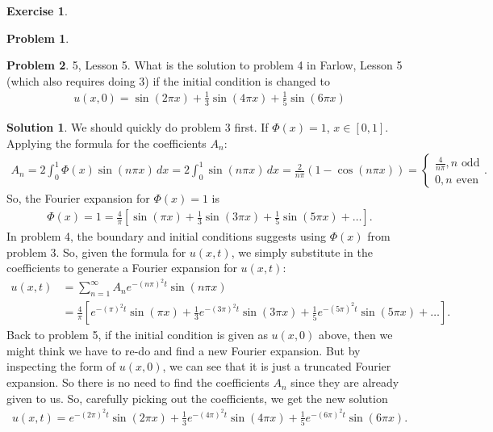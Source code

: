 \documentclass{article}
\theoremstyle{definition}
\newtheorem*{prob*}{Problem}
\newtheorem{exer}{Exercise}[section]
\newtheorem*{sln*}{Solution}
\begin{document}
\begin{exer}
\begin{prob*}
	\end{prob*}
	\newpage
	\begin{prob*}5, Lesson 5. What is the solution to problem 4 in Farlow, Lesson 5 (which also requires doing 3) if the initial condition is changed to 
		\begin{align*}
		u(x,0) = \sin(2\pi x) + \frac{1}{3}\sin(4\pi x) + \frac{1}{5}\sin(6\pi x)
		\end{align*}
		\begin{sln*}
			We should quickly do problem 3 first. If $\Phi(x) = 1$, $x\in[0,1]$. Applying the formula for the coefficients $A_n$:
			\begin{align*}
			A_n = 2\int_0^1\Phi(x)\sin(n\pi x)\,dx = 2\int_0^1\sin(n\pi x)\,dx = \frac{2}{n\pi}(1-\cos(n\pi x)) = \begin{cases}
			\frac{4}{n\pi}, n \text{ odd}\\
			0, n\text{ even}
			\end{cases}.
			\end{align*}
			So, the Fourier expansion for $\Phi(x) = 1$ is
			\begin{align*}
			\Phi(x) =1 = \frac{4}{\pi}\left[\sin(\pi x) + \frac{1}{3}\sin(3\pi x) + \frac{1}{5}\sin(5\pi x)+\dots \right].
			\end{align*}
			In problem 4, the boundary and initial conditions suggests using $\Phi(x)$ from problem 3. So, given the formula for $u(x,t)$, we simply substitute in the coefficients to generate a Fourier expansion for $u(x,t)$:
			\begin{align*}
			u(x,t) &= \sum_{n=1}^{\infty}A_n e^{-(n\pi)^2t}\sin(n\pi x)\\
			&= \frac{4}{\pi}\left[ e^{-(\pi)^2t}\sin(\pi x) + \frac{1}{3}e^{-(3\pi)^2t}\sin(3\pi x)
			+ \frac{1}{5}e^{-(5\pi)^2t}\sin(5\pi x)+\dots\right].
			\end{align*}
			Back to problem 5, if the initial condition is given as $u(x,0)$ above, then we might think we have to re-do and find a new Fourier expansion. But by inspecting the form of $u(x,0)$, we can see that it is just a truncated Fourier expansion. So there is no need to find the coefficients $A_n$ since they are already given to us. So, carefully picking out the coefficients, we get the new solution
			\begin{align*}
			u(x,t) = e^{-(2\pi)^2t}\sin(2\pi x) + \frac{1}{3}e^{-(4\pi)^2t}\sin(4\pi x) + \frac{1}{5}e^{-(6\pi)^2t}\sin(6\pi x).
			\end{align*}
		\end{sln*}
	\end{prob*}
\end{exer}
\end{document}
